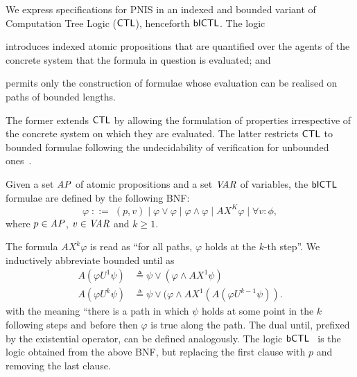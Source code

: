 \begin{example}
\begin{center}
  \end{center}
 
\end{example}


We express specifications for PNIS in an indexed and bounded variant of
Computation Tree Logic ($\sf{CTL}$), henceforth $\sf{bICTL}$. The logic
\begin{inparaenum}[\it (i)]
\item introduces indexed atomic propositions that are quantified over the
  agents of the concrete system that the formula in question is evaluated; and
\item permits only the construction of formulae whose evaluation can be
  realised on paths of bounded lengths.
\end{inparaenum}
The former extends $\sf{CTL}$ by allowing the formulation of properties
irrespective of the concrete system on which they are evaluated.  The latter
restricts $\sf{CTL}$ to bounded formulae following the undecidability of
verification for unbounded ones~\cite{Akintunde+20}.

\begin{definition}
Given a  set $\it{AP}$ of atomic propositions and a set $\it{VAR}$ of variables,
the $\sf{bICTL}$  formulae are defined by the following BNF:
\[
  \varphi \;   ::= \; (p, v) \mid \varphi \lor \varphi \mid \varphi \land \varphi
  \mid AX^K \varphi \mid \forall v : \phi,
\]
where  $p \in \it{AP}$, $v \in \it{VAR}$ and $k \geq  1$.
\end{definition}

The formula $AX^k \varphi$ is read as ``for all paths, $\varphi$ holds at the
$k$-th step''. We inductively abbreviate bounded until as
\begin{align*}
 A(\varphi U^1 \psi) &\triangleq \psi \lor (\varphi \land AX^1 \psi) \\
 A(\varphi U^k \psi) &\triangleq \psi \lor (\varphi \land AX^1 (A (\varphi U^{k-1} \psi)).
\end{align*}
with the meaning ``there is a path in which $\psi$ holds at some point in the
$k$ following steps and before then $\varphi$ is true along the path. 
The dual
until, prefixed by the existential operator, can be defined analogously.
The logic $\sf{bCTL}$~\cite{Akintunde+22} is the logic obtained from the above BNF, but
replacing the first clause with $p$ and removing the last clause.

